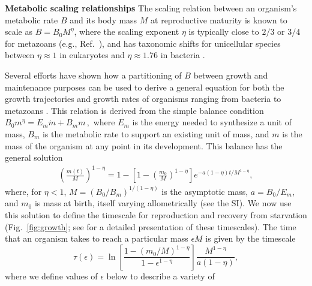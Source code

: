\documentclass[twocolumn,preprintnumbers,amsmath,amssymb,superscriptaddress]{revtex4}
\begin{document}
\begin{bibunit}[unsrt]
{  {\bf Metabolic scaling relationships} The scaling relation between an
  organism's metabolic rate $B$ and its body mass $M$ at reproductive maturity
  is known to scale as $B = B_0 M^\eta$, where the scaling exponent $\eta$ is
  typically close to $2/3$ or $3/4$ for metazoans (e.g.,
  Ref.~\citep{West:2002it,Brown:2004wq}), and has taxonomic shifts for
  unicellular species between $\eta\approx 1$ in eukaryotes and
  $\eta\approx 1.76$ in bacteria \citep{DeLong:2010dy,Kempes:2012hy}.

  Several efforts have shown how a partitioning of $B$ between growth and
  maintenance purposes can be used to derive a general equation for both the
  growth trajectories and growth rates of organisms ranging from bacteria to
  metazoans
  \citep{West:2001bv,moses2008rmo,gillooly2002esa,hou,Savage:2004ed,Kempes:2012hy}. This relation is derived from the simple balance condition 
  $B_{0}m^{\eta}=E_{m}\dot{m}+B_{m}m\,,$
  \citep{West:2001bv,moses2008rmo,gillooly2002esa,hou,Savage:2004ed,Kempes:2012hy} where $E_{m}$ is the energy needed to synthesize a unit of mass, $B_{m}$ is
  the metabolic rate to support an existing unit of mass, and $m$ is the mass
  of the organism at any point in its development.  This balance has the
  general solution \citep{bettencourt,Kempes:2012hy}
  \begin{eqnarray}
  \label{m1}
  \left(\frac{m\left(t\right)}{M}\right)^{1-\eta}\!=1\!-\!\left[1\!-\!\left(\frac{m_{0}}{M}\right)^{1\!-\!\eta}\right]e^{-a\left(1\!-\!\eta\right)t/M^{1-\eta}},
  \end{eqnarray}
  where, for $\eta<1$, $M=(B_{0}/B_{m})^{1/(1-\eta)}$ is the asymptotic mass,
  $a=B_{0}/E_{m}$, and $m_0$ is mass at birth, itself varying allometrically
  (see the SI).  We now use this solution to define the timescale for
  reproduction and recovery from starvation (Fig.~\ref{fig:growth}; see
  \citep{moses2008rmo} for a detailed presentation of these timescales). The
  time that an organism takes to reach a particular mass $\epsilon M$ is given
  by the timescale
  \begin{equation}
  \label{t1}
  \tau\left(\epsilon\right) = \ln\left[\frac{1-\left(m_{0}/M\right)^{1-\eta}}{1-\epsilon^{1-\eta}}\right]\frac{M^{1-\eta}}{a\left(1-\eta\right)},
  \end{equation}
  where we define values of $\epsilon$ below to describe a variety of
}
\end{bibunit}
\end{document}
